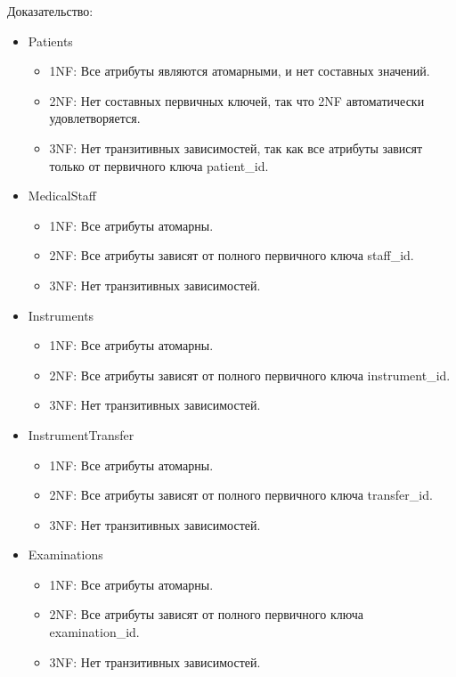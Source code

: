 \documentclass[14pt]{extreport}
\begin{document}
    Доказательство:
        \begin{itemize}
            \item Patients \begin{itemize}
                      \item 1NF: Все атрибуты являются атомарными, и нет составных значений.
                      \item 2NF: Нет составных первичных ключей, так что 2NF автоматически удовлетворяется.
                      \item 3NF: Нет транзитивных зависимостей, так как все атрибуты зависят только от первичного ключа patient\_id.
            \end{itemize}

            \item MedicalStaff \begin{itemize}
                      \item 1NF: Все атрибуты атомарны.
                      \item 2NF: Все атрибуты зависят от полного первичного ключа staff\_id.
                      \item 3NF: Нет транзитивных зависимостей.
            \end{itemize}

            \item Instruments \begin{itemize}
                      \item 1NF: Все атрибуты атомарны.
                      \item 2NF: Все атрибуты зависят от полного первичного ключа instrument\_id.
                      \item 3NF: Нет транзитивных зависимостей.
            \end{itemize}

            \item InstrumentTransfer \begin{itemize}
                      \item 1NF: Все атрибуты атомарны.
                      \item 2NF: Все атрибуты зависят от полного первичного ключа transfer\_id.
                      \item 3NF: Нет транзитивных зависимостей.
            \end{itemize}

            \item Examinations \begin{itemize}
                      \item 1NF: Все атрибуты атомарны.
                      \item 2NF: Все атрибуты зависят от полного первичного ключа examination\_id.
                      \item 3NF: Нет транзитивных зависимостей.
            \end{itemize}
        \end{itemize}
\end{document}
